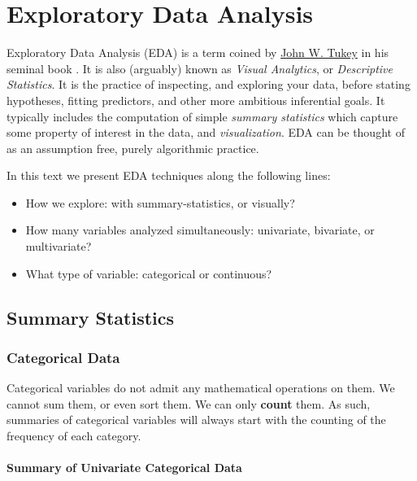 \documentclass[]{book}
\providecommand{\tightlist}{%
  \setlength{\itemsep}{0pt}\setlength{\parskip}{0pt}}
\theoremstyle{definition}
\theoremstyle{definition}
\theoremstyle{definition}
\theoremstyle{remark}
\begin{document}
\chapter{Exploratory Data Analysis}\label{eda}

Exploratory Data Analysis (EDA) is a term coined by
\href{https://en.wikipedia.org/wiki/John_Tukey}{John W. Tukey} in his
seminal book \citep{tukey1977exploratory}. It is also (arguably) known
as \emph{Visual Analytics}, or \emph{Descriptive Statistics}. It is the
practice of inspecting, and exploring your data, before stating
hypotheses, fitting predictors, and other more ambitious inferential
goals. It typically includes the computation of simple \emph{summary
statistics} which capture some property of interest in the data, and
\emph{visualization}. EDA can be thought of as an assumption free,
purely algorithmic practice.

In this text we present EDA techniques along the following lines:

\begin{itemize}
\tightlist
\item
  How we explore: with summary-statistics, or visually?
\item
  How many variables analyzed simultaneously: univariate, bivariate, or
  multivariate?
\item
  What type of variable: categorical or continuous?
\end{itemize}

\section{Summary Statistics}\label{summary-statistics}

\subsection{Categorical Data}\label{categorical-data}

Categorical variables do not admit any mathematical operations on them.
We cannot sum them, or even sort them. We can only \textbf{count} them.
As such, summaries of categorical variables will always start with the
counting of the frequency of each category.

\subsubsection{Summary of Univariate Categorical
Data}\label{summary-of-univariate-categorical-data}
\end{document}
